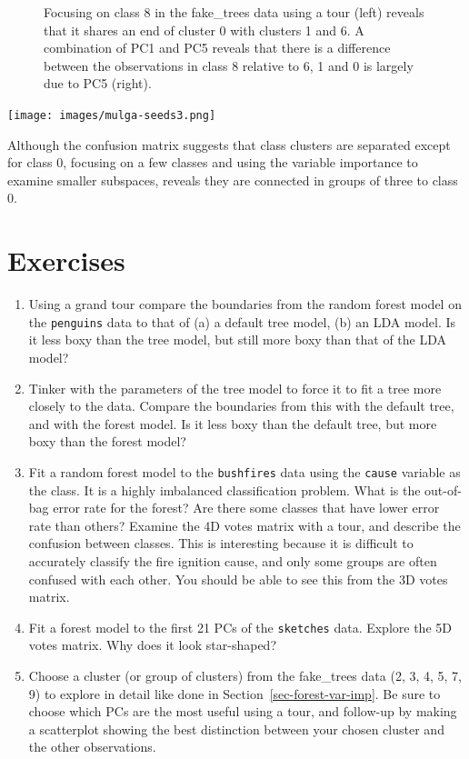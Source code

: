 \documentclass[
  letterpaper,
]{krantz}
\providecommand{\tightlist}{%
  \setlength{\itemsep}{0pt}\setlength{\parskip}{0pt}}\usepackage{longtable,booktabs,array}
\newcommand{\insightbox}[1]{%
\noindent\colorbox{insight!30}{%
\begin{minipage}{0.98\textwidth}%
    \centering%
    \begin{minipage}[c]{0.15\textwidth} %
      \texttt{[image: images/mulga-seeds3.png]} %
    \end{minipage}%
    \hfill %
    \begin{minipage}[c]{0.8\textwidth} %
      \bigskip%
      \textsf{#1}%
      \bigskip%
    \end{minipage}%
    \hspace*{3mm}%
  \end{minipage}%
}%
}
\begin{document}
\begin{figure}
\begin{minipage}[t]{0.50\linewidth}
{{}

}

\end{minipage}%

\caption{\label{fig-ft-cl2}Focusing on class 8 in the fake\_trees data
using a tour (left) reveals that it shares an end of cluster 0 with
clusters 1 and 6. A combination of PC1 and PC5 reveals that there is a
difference between the observations in class 8 relative to 6, 1 and 0 is
largely due to PC5 (right).}

\end{figure}

\insightbox{Although the confusion matrix suggests that class clusters are separated except for class 0, focusing on a few classes and using the variable importance to examine smaller subspaces, reveals they are connected in groups of three to class 0.}

\hypertarget{exercises-8}{%
\section*{Exercises}\label{exercises-8}}


\begin{enumerate}
\def\labelenumi{\arabic{enumi}.}
\tightlist
\item
  Using a grand tour compare the boundaries from the random forest model
  on the \texttt{penguins} data to that of (a) a default tree model, (b)
  an LDA model. Is it less boxy than the tree model, but still more boxy
  than that of the LDA model?
\item
  Tinker with the parameters of the tree model to force it to fit a tree
  more closely to the data. Compare the boundaries from this with the
  default tree, and with the forest model. Is it less boxy than the
  default tree, but more boxy than the forest model?
\item
  Fit a random forest model to the \texttt{bushfires} data using the
  \texttt{cause} variable as the class. It is a highly imbalanced
  classification problem. What is the out-of-bag error rate for the
  forest? Are there some classes that have lower error rate than others?
  Examine the 4D votes matrix with a tour, and describe the confusion
  between classes. This is interesting because it is difficult to
  accurately classify the fire ignition cause, and only some groups are
  often confused with each other. You should be able to see this from
  the 3D votes matrix.
\item
  Fit a forest model to the first 21 PCs of the \texttt{sketches} data.
  Explore the 5D votes matrix. Why does it look star-shaped?
\item
  Choose a cluster (or group of clusters) from the fake\_trees data (2,
  3, 4, 5, 7, 9) to explore in detail like done in
  Section~\ref{sec-forest-var-imp}. Be sure to choose which PCs are the
  most useful using a tour, and follow-up by making a scatterplot
  showing the best distinction between your chosen cluster and the other
  observations.
\end{enumerate}
\end{document}
